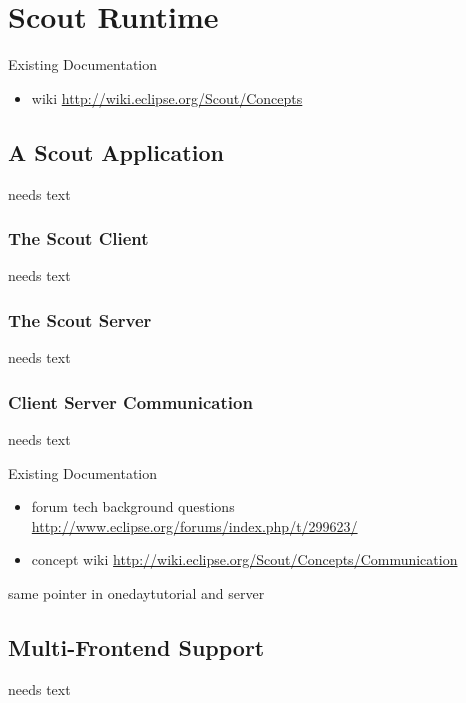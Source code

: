 \documentclass[a4paper,10pt,twoside]{book}
\begin{document}
  \sloppy
\fi


\chapter{Scout Runtime}

\noindent Existing Documentation
\begin{itemize}
  \item wiki \url{http://wiki.eclipse.org/Scout/Concepts}
\end{itemize}

\section{A Scout Application}
needs text

\subsection{The Scout Client}
needs text

\subsection{The Scout Server}
needs text

\subsection{Client Server Communication}
needs text

\noindent Existing Documentation
\begin{itemize}
  \item forum tech background questions \url{http://www.eclipse.org/forums/index.php/t/299623/}
  \item concept wiki \url{http://wiki.eclipse.org/Scout/Concepts/Communication}
\end{itemize}

same pointer in onedaytutorial and server

\section{Multi-Frontend Support}
needs text

\end{document}
